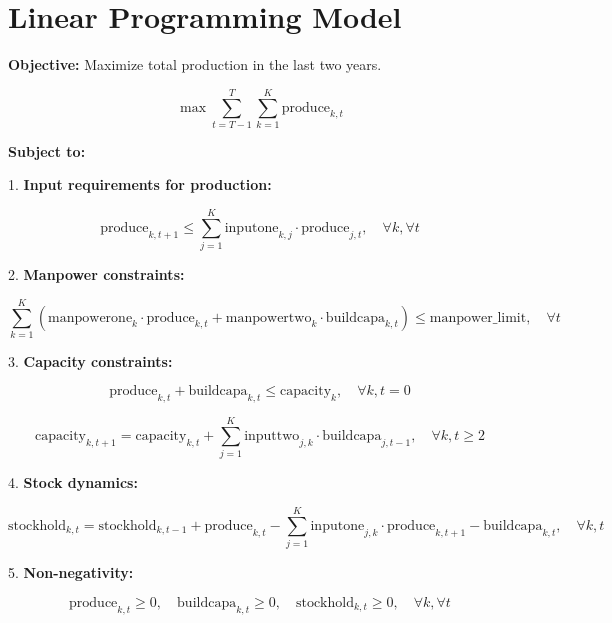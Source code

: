 \documentclass{article}
\begin{document}
\section*{Linear Programming Model}

\textbf{Objective:} Maximize total production in the last two years.

\[
\max \sum_{t=T-1}^{T} \sum_{k=1}^{K} \text{produce}_{k, t}
\]

\textbf{Subject to:}

1. \textbf{Input requirements for production:}

\[
\text{produce}_{k, t+1} \leq \sum_{j=1}^{K} \text{inputone}_{k,j} \cdot \text{produce}_{j, t}, \quad \forall k, \forall t
\]

2. \textbf{Manpower constraints:}

\[
\sum_{k=1}^{K} \left( \text{manpowerone}_{k} \cdot \text{produce}_{k, t} + \text{manpowertwo}_{k} \cdot \text{buildcapa}_{k, t} \right) \leq \text{manpower\_limit}, \quad \forall t
\]

3. \textbf{Capacity constraints:}

\[
\text{produce}_{k, t} + \text{buildcapa}_{k, t} \leq \text{capacity}_{k}, \quad \forall k, t=0
\]

\[
\text{capacity}_{k,t+1} = \text{capacity}_{k,t} + \sum_{j=1}^{K} \text{inputtwo}_{j,k} \cdot \text{buildcapa}_{j, t-1}, \quad \forall k, t \geq 2
\]

4. \textbf{Stock dynamics:}

\[
\text{stockhold}_{k, t} = \text{stockhold}_{k, t-1} + \text{produce}_{k, t} - \sum_{j=1}^{K} \text{inputone}_{j,k} \cdot \text{produce}_{k,t+1} - \text{buildcapa}_{k, t}, \quad \forall k, t
\]

5. \textbf{Non-negativity:}

\[
\text{produce}_{k, t} \geq 0, \quad \text{buildcapa}_{k, t} \geq 0, \quad \text{stockhold}_{k, t} \geq 0, \quad \forall k, \forall t
\]
\end{document}
